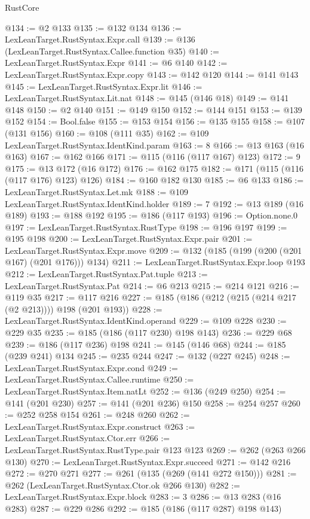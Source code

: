 \begin{lexlean}{RustCore}
\begin{coremodule}
@134 := @2 @133
@135 := @132 @134
@136 := LexLeanTarget.RustSyntax.Expr.call
@139 := @136 (LexLeanTarget.RustSyntax.Callee.function @35)
@140 := LexLeanTarget.RustSyntax.Expr
@141 := @6 @140
@142 := LexLeanTarget.RustSyntax.Expr.copy
@143 := @142 @120
@144 := @141 @143
@145 := LexLeanTarget.RustSyntax.Expr.lit
@146 := LexLeanTarget.RustSyntax.Lit.nat
@148 := @145 (@146 @18)
@149 := @141 @148
@150 := @2 @140
@151 := @149 @150
@152 := @144 @151
@153 := @139 @152
@154 := Bool.false
@155 := @153 @154
@156 := @135 @155
@158 := @107 (@131 @156)
@160 := @108 (@111 @35)
@162 := @109 LexLeanTarget.RustSyntax.IdentKind.param
@163 := 8
@166 := @13 @163 (@16 @163)
@167 := @162 @166
@171 := @115 (@116 (@117 @167) @123)
@172 := 9
@175 := @13 @172 (@16 @172)
@176 := @162 @175
@182 := @171 (@115 (@116 (@117 @176) @123) @126)
@184 := @160 @182 @130
@185 := @6 @133
@186 := LexLeanTarget.RustSyntax.Let.mk
@188 := @109 LexLeanTarget.RustSyntax.IdentKind.holder
@189 := 7
@192 := @13 @189 (@16 @189)
@193 := @188 @192
@195 := @186 (@117 @193)
@196 := Option.none.{0}
@197 := LexLeanTarget.RustSyntax.RustType
@198 := @196 @197
@199 := @195 @198
@200 := LexLeanTarget.RustSyntax.Expr.pair
@201 := LexLeanTarget.RustSyntax.Expr.move
@209 := @132 (@185 (@199 (@200 (@201 @167) (@201 @176))) @134)
@211 := LexLeanTarget.RustSyntax.Expr.loop @193
@212 := LexLeanTarget.RustSyntax.Pat.tuple
@213 := LexLeanTarget.RustSyntax.Pat
@214 := @6 @213
@215 := @214 @121
@216 := @119 @35
@217 := @117 @216
@227 := @185 (@186 (@212 (@215 (@214 @217 (@2 @213)))) @198 (@201 @193))
@228 := LexLeanTarget.RustSyntax.IdentKind.operand
@229 := @109 @228
@230 := @229 @35
@235 := @185 (@186 (@117 @230) @198 @143)
@236 := @229 @68
@239 := @186 (@117 @236) @198
@241 := @145 (@146 @68)
@244 := @185 (@239 @241) @134
@245 := @235 @244
@247 := @132 (@227 @245)
@248 := LexLeanTarget.RustSyntax.Expr.cond
@249 := LexLeanTarget.RustSyntax.Callee.runtime
@250 := LexLeanTarget.RustSyntax.Item.natLt
@252 := @136 (@249 @250)
@254 := @141 (@201 @230)
@257 := @141 (@201 @236) @150
@258 := @254 @257
@260 := @252 @258 @154
@261 := @248 @260
@262 := LexLeanTarget.RustSyntax.Expr.construct
@263 := LexLeanTarget.RustSyntax.Ctor.err
@266 := LexLeanTarget.RustSyntax.RustType.pair @123 @123
@269 := @262 (@263 @266 @130)
@270 := LexLeanTarget.RustSyntax.Expr.succeed
@271 := @142 @216
@272 := @270 @271
@277 := @261 (@135 (@269 (@141 @272 @150)))
@281 := @262 (LexLeanTarget.RustSyntax.Ctor.ok @266 @130)
@282 := LexLeanTarget.RustSyntax.Expr.block
@283 := 3
@286 := @13 @283 (@16 @283)
@287 := @229 @286
@292 := @185 (@186 (@117 @287) @198 @143)

\end{coremodule}
\end{lexlean}

